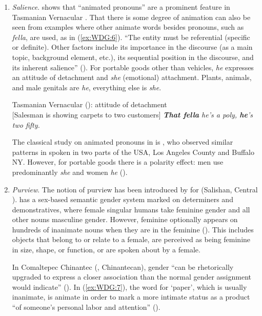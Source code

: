 \documentclass[output=collectionpaper]{langsci/langscibook}
\begin{document}
\begin{enumerate}[label=(\roman*)]
\item \textit{Salience}. \cite{Pawley2004} shows that ``animated pronouns'' are a prominent feature in Tasmanian Vernacular . That there is some degree of animation can also be seen from examples where other animate words besides pronouns, such as \textit{fella}, are used, as in (\ref{ex:WDG:6}). ``The entity must be referential (specific or definite). Other factors include its importance in the discourse (as a main topic, background element, etc.), its sequential position in the discourse, and its inherent salience'' (\citealt[114]{Pawley2004}). For portable goods other than vehicles, \textit{he} expresses an attitude of detachment and \textit{she} (emotional) attachment. Plants, animals, and male genitals are \textit{he}, everything else is \textit{she}.

\ea\label{ex:WDG:6}
Tasmanian Vernacular  (\citealt[126]{Pawley2004}): attitude of detachment\\
{[}Salesman is showing carpets to two customers{]} \textit{\textbf{That fella} he's a poly, \textbf{he}'s two fifty.}\\
\z

The classical study on animated pronouns in  is \cite{Mathiot1978}, who observed similar patterns in spoken  in two parts of the USA, Los Angeles County and Buffalo NY. However, for portable goods there is a polarity effect: men use predominantly \textit{she} and women \textit{he} (\citealt[134]{Pawley2004}).

\item \textit{Purview}. The notion of purview has been introduced by \cite{Gerdts2013} for  (Salishan, Central ).  has a sex-based semantic gender system marked on determiners and demonstratives, where female singular humans take feminine gender and all other nouns masculine gender. However, feminine optionally appears on hundreds of inanimate nouns when they are in the feminine  (\citealt{Gerdts2013}). This includes objects that belong to or relate to a female, are perceived as being feminine in size, shape, or function, or are spoken about by a female.

In Comaltepec Chinantec (, Chinantecan), gender ``can be rhetorically upgraded to express a closer association than the normal gender assignment would indicate'' (\citealt[57]{Anderson1989a}). In (\ref{ex:WDG:7}), the word for `paper', which is usually inanimate, is animate in order to mark a more intimate status as a product ``of someone's personal labor and attention'' (\citealt[57]{Anderson1989a}).


\end{enumerate}
\end{document}
